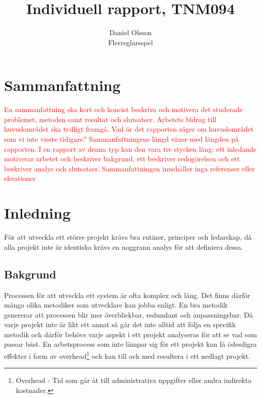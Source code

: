 \documentclass[a4paper,12pt,oneside,final]{extbook}
\title{Individuell rapport, TNM094}
\author{Daniel Olsson\\Flerreglarsspel}
\begin{document}
\pagestyle{empty}
\thispagestyle{empty}

\frontmatter

\maketitle

\pagestyle{fancy}

\chapter{Sammanfattning}

\textcolor{red}{
En sammanfattning ska kort och koncist beskriva och motivera det studerade problemet, metoden
samt resultat och slutsatser. Arbetets bidrag till huvudområdet ska tydligt framgå. Vad är det rapporten
säger om huvudområdet som vi inte visste tidigare?
Sammanfattningens längd växer med längden på rapporten. I en rapport av denna typ kan den vara tre
stycken lång: ett inledande motiverar arbetet och beskriver bakgrund, ett beskriver redogörelsen och
ett beskriver analys och slutsatser. Sammanfattningen innehåller inga referenser eller ekvationer}


\tableofcontents

\cleardoublepage
{}
\listoffigures

\cleardoublepage
{}
\listoftables

\mainmatter

\chapter{Inledning}
\label{ch:inledning}

För att utveckla ett större projekt krävs bra rutiner, principer och ledarskap, då alla projekt inte är identiska krävs en noggrann analys för att definiera dessa.

\section{Bakgrund}
 Processen för att utveckla ett system är ofta komplex och lång. Det finns därför många olika metodiker som utvecklare kan jobba enligt. En bra metodik genererar att processen blir mer överblickbar, redundant och anpassningsbar. Då varje projekt inte är likt ett annat så går det inte alltid att följa en specifik metodik och därför behövs varje aspekt i ett projekt analyseras för att se vad som passar bäst. En arbetsprocess som inte lämpar sig för ett projekt kan få ödesdigra effekter i form av overhead\footnote{Overhead - Tid som går åt till administrativa uppgifter eller andra indirekta kostnader.} och kan till och med resultera i ett nedlagt projekt.
\end{document}
